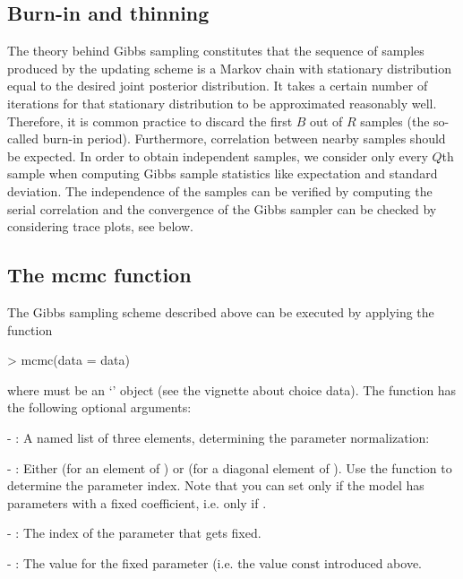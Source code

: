 \documentclass[article]{jss}
\newcommand{\class}[1]{`\code{#1}'}
\newcommand{\fct}[1]{\code{#1()}}
\begin{document}
\subsection{Burn-in and thinning} \label{subsec:burn_thin}

The theory behind Gibbs sampling constitutes that the sequence of samples produced by the updating scheme is a Markov chain with stationary distribution equal to the desired joint posterior distribution. It takes a certain number of iterations for that stationary distribution to be approximated reasonably well. Therefore, it is common practice to discard the first $B$ out of $R$ samples (the so-called burn-in period). Furthermore, correlation between nearby samples should be expected. In order to obtain independent samples, we consider only every $Q$th sample when computing Gibbs sample statistics like expectation and standard deviation. The independence of the samples can be verified by computing the serial correlation and the convergence of the Gibbs sampler can be checked by considering trace plots, see below.

\subsection{The mcmc function} \label{subsec:mcmc_function}

The Gibbs sampling scheme described above can be executed by applying the function

\begin{Schunk}
\begin{Sinput}
> mcmc(data = data)
\end{Sinput}
\end{Schunk}

where  must be an \class{RprobitB\_data} object (see the vignette about choice data). The function has the following optional arguments:

- : A named list of three elements, determining the parameter normalization:

  - : Either  (for an element of ) or  (for a diagonal element of ). Use the \fct{overview\_effects} function to determine the parameter index. Note that you can set  only if the model has parameters with a fixed coefficient, i.e. only if .

  - : The index of the parameter that gets fixed.

  - : The value for the fixed parameter (i.e. the value $\text{const}$ introduced above.
\end{document}
